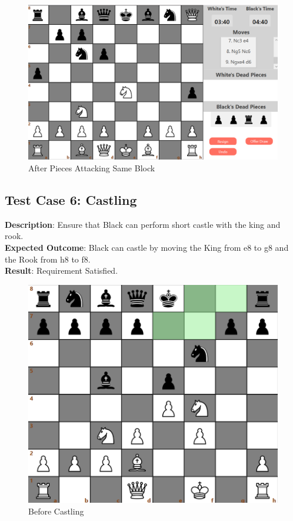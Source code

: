 \documentclass[a4paper,12pt]{article}
\begin{document}
\begin{figure}[H]
    \centering
    \includegraphics[width=0.7\linewidth]{Images/Test Cases/testCase5Part2Img2.png}
    \caption{After Pieces Attacking Same Block}
    \label{fig:AfterAttackingSameBlock}
\end{figure}

\subsection{Test Case 6: Castling}
\textbf{Description}: Ensure that Black can perform short castle with the king and rook.\\
\textbf{Expected Outcome}: Black can castle by moving the King from e8 to g8 and the Rook from h8 to f8.\\
\textbf{Result}: Requirement Satisfied.

\begin{figure}[H]
    \centering
    \includegraphics[width=0.6\linewidth]{Images/Test Cases/testCase6Img1.png}
    \caption{Before Castling}
    \label{fig:BeforeCastling}
\end{figure}
\end{document}
